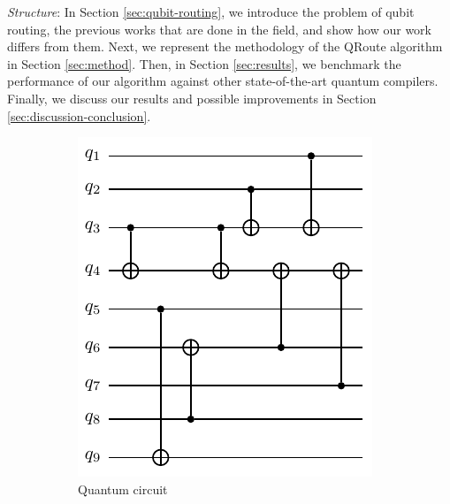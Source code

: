 \documentclass[%
 reprint,
 longbibliography,
 amsmath,amssymb,
 aps,
]{revtex4-2}
\begin{document}
\textit{Structure}: In Section \ref{sec:qubit-routing}, we introduce the problem of qubit routing, the previous works that are done in the field, and show how our work differs from them. Next, we represent the methodology of the QRoute algorithm in Section \ref{sec:method}. Then, in Section \ref{sec:results}, we benchmark the performance of our algorithm against other state-of-the-art quantum compilers. Finally, we discuss our results and  possible improvements in Section \ref{sec:discussion-conclusion}.

\begin{figure}[t]
    \centering
    \begin{subfigure}[b]{0.30\linewidth}
        \includegraphics[width=\textwidth]{images/orig_circ.pdf}
        \caption{Quantum circuit\label{fig:orig_circ}}
    \end{subfigure}
    \begin{subfigure}[b]{0.30\linewidth}

\end{subfigure}
\end{figure}
\end{document}
